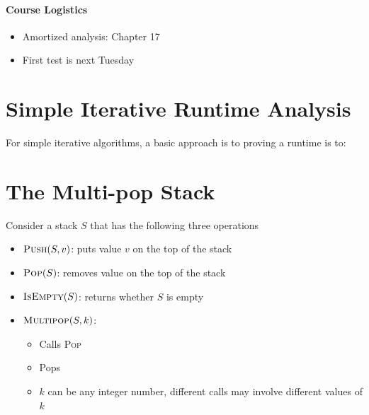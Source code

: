 \documentclass[11  pt]{article}
\begin{document}
	
	
	\paragraph{Course Logistics}
	
	\begin{itemize}
		\item Amortized analysis: Chapter 17
		\item First test is next Tuesday
	\end{itemize}
	
	\section{Simple Iterative Runtime Analysis}
	For simple iterative algorithms, a basic approach is to proving a runtime is to:
	
	
	\newpage
	
	\section{The Multi-pop Stack}
	Consider a stack $S$ that has the following three operations
	\begin{itemize}
		\item $\textsc{Push}(S,v)$: puts value $v$ on the top of the stack
		\item $\textsc{Pop}(S)$: removes value on the top of the stack
		\item $\textsc{IsEmpty}(S)$: returns whether $S$ is empty
		\item $\textsc{Multipop}(S,k)$: 
		\begin{itemize}
			
			\item Calls \textsc{Pop} \\%
			\item Pops \\%
			\item $k$ can be any integer number, different calls may involve different values of $k$
		\end{itemize}
	\end{itemize}
	
	\vfill
	
\end{document}
